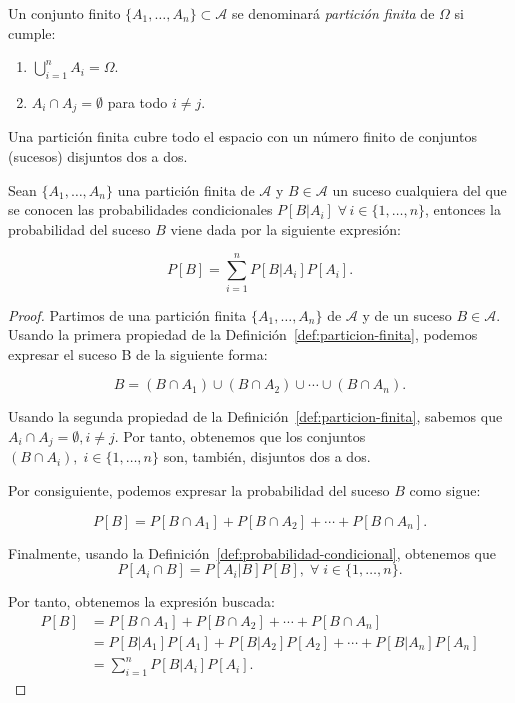 \begin{definicion}\label{def:particion-finita}
    Un conjunto finito $\{A_1, \ldots, A_n \} \subset \mathcal{A}$ se denominará \emph{partición finita} de $\Omega$ si cumple:

    \begin{enumerate}
        \item $\bigcup\limits_{i=1}^n A_i = \Omega$.
        \item $A_i \cap A_j = \emptyset$ para todo $i \neq j$.
    \end{enumerate}
\end{definicion}

Una partición finita cubre todo el espacio con un número finito de conjuntos (sucesos) disjuntos dos a dos.

\begin{teorema}\label{teo:probabilidad-total}
    Sean $\{A_1, \ldots, A_n \}$ una partición finita de $\mathcal{A}$ y $B \in \mathcal{A}$ un suceso cualquiera del que se conocen las probabilidades condicionales $P[B|A_i] \; \forall \, i \in \{1, \ldots, n \}$, entonces la probabilidad del suceso $B$ viene dada por la siguiente expresión:

    \[ P[B] = \sum_{i=1}^{n} P[B|A_i]P[A_i]. \]
\end{teorema}

\begin{proof}
    Partimos de una partición finita $\{A_1, \ldots, A_n \}$ de $\mathcal{A}$ y de un suceso $B \in \mathcal{A}$. Usando la primera propiedad de la Definición~\ref{def:particion-finita}, podemos expresar el suceso B de la siguiente forma:

    \[ B = (B \cap A_1) \cup (B \cap A_2) \cup \cdots \cup (B \cap A_n). \]

    Usando la segunda propiedad de la Definición~\ref{def:particion-finita}, sabemos que $A_i \cap A_j = \emptyset, i \neq j$. Por tanto, obtenemos que los conjuntos $(B \cap A_i), \; i \in \{1, \ldots, n\}$ son, también, disjuntos dos a dos.

    Por consiguiente, podemos expresar la probabilidad del suceso $B$ como sigue:

    \[ P[B] = P[B \cap A_1] + P[B \cap A_2] + \cdots + P[B \cap A_n]. \]

    Finalmente, usando la Definición~\ref{def:probabilidad-condicional}, obtenemos que 
    \[ P[A_i \cap B] = P[A_i | B]P[B],\; \forall \; i \in \{1, \ldots, n\}. \]
    
    Por tanto, obtenemos la expresión buscada:
    \begin{align*}
        P[B] &= P[B \cap A_1] + P[B \cap A_2] + \cdots + P[B \cap A_n] \\
             &= P[B|A_1]P[A_1] + P[B|A_2]P[A_2] + \cdots + P[B|A_n]P[A_n] \\
             &= \sum_{i=1}^n P[B|A_i]P[A_i].
    \end{align*}
\end{proof}

